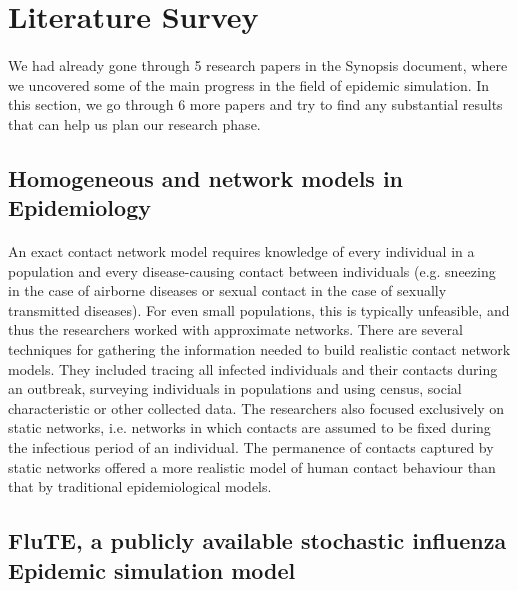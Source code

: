 \documentclass[14pt, a4paper]{extarticle}
\begin{document}
    \newpage
	\thispagestyle{empty}
	\tableofcontents
	
	\newpage
    \section{Literature Survey}
        \paragraph{} We had already gone through 5 research papers in the Synopsis document, where we uncovered some of the main progress in the field of epidemic simulation. In this section, we go through 6 more papers and try to find any substantial results that can help us plan our research phase.
        
        \subsection{Homogeneous and network models in Epidemiology}
            \paragraph{} An exact contact network model requires knowledge of every individual in a population and every disease-causing contact between individuals (e.g. sneezing in the case of airborne diseases or sexual contact in the case of sexually transmitted diseases). For even small populations, this is typically unfeasible, and thus the researchers worked with approximate networks. There are several techniques for gathering the information needed to build realistic contact network models. They included tracing all infected individuals and their contacts during an outbreak, surveying individuals in populations and using census, social characteristic or other collected data. The researchers also focused exclusively on static networks, i.e. networks in which contacts are assumed to be fixed during the infectious period of an individual. The permanence of contacts captured by static networks offered a more realistic model of human contact behaviour than that by traditional epidemiological models.
            
        \subsection{FluTE, a publicly available stochastic influenza Epidemic simulation model}
\end{document}
